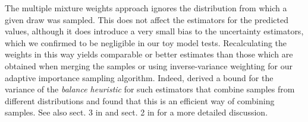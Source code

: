 \documentclass[a4paper,fleqn,usenatbib,useAMS,usedcolumn]{mnras}
\begin{document}
The multiple mixture weights approach ignores the distribution from which a given draw was sampled. This does not affect the estimators for the predicted values, although it does introduce a very small bias to the uncertainty estimators, which we confirmed to be negligible in our toy model tests.  Recalculating the weights in this way yields comparable or better estimates than those which are obtained when merging the samples or using inverse-variance weighting for our adaptive importance sampling algorithm. Indeed, \citet{2014arXiv1411.3954H} derived a bound for the variance of the \textit{balance heuristic} for such estimators that combine samples from different distributions and found that this is an efficient way of combining samples.
 See also sect. 3 in \citet{Veach:1995:OCS:218380.218498} and sect. 2 in \citet{cornuet2012adaptive} for a more detailed discussion. 
\end{document}

